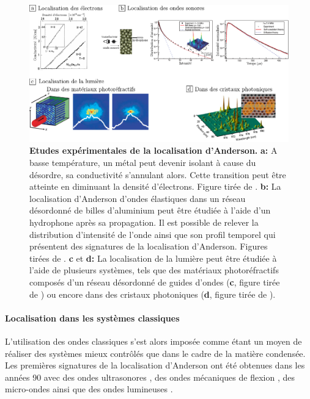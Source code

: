 \begin{figure}
\centering
\includegraphics[width=\textwidth]{Fig/Localisation/experiences_localisation_anderson.pdf}
\caption{\textbf{Etudes expérimentales de la localisation d'Anderson.} \textbf{a:} A basse température, un métal peut devenir isolant à cause du désordre, sa conductivité s'annulant alors. Cette transition peut être atteinte en diminuant la densité d'électrons. Figure tirée de \citep{katsumoto1987fine}. \textbf{b:} La localisation d'Anderson d'ondes élastiques dans un réseau désordonné de billes d'aluminium peut être étudiée à l'aide d'un hydrophone après sa propagation. Il est possible de relever la distribution d'intensité de l'onde ainsi que son profil temporel qui présentent des signatures de la localisation d'Anderson. Figures tirées de \citep{hu2008localization}. \textbf{c} et \textbf{d:} La localisation de la lumière peut être étudiée à l'aide de plusieurs systèmes, tels que des matériaux photoréfractifs composés d'un réseau désordonné de guides d'ondes (\textbf{c}, figure tirée de \citep{schwartz2007transport}) ou encore dans des cristaux photoniques (\textbf{d}, figure tirée de \citep{sapienza2010cavity}).}
\label{fig:experiences_localisation_anderson}
\end{figure}

\paragraph*{Localisation dans les systèmes classiques} 
L'utilisation des ondes classiques s'est alors imposée comme étant un moyen de réaliser des systèmes mieux contrôlés que dans le cadre de la matière condensée. Les premières signatures de la localisation d'Anderson ont été obtenues dans les années 90 avec des ondes ultrasonores \citep{weaver1990anderson}, des ondes mécaniques de flexion \citep{ye1992observation}, des micro-ondes \citep{genack1991observation} ainsi que des ondes lumineuses \citep{wiersma1997localization}. 

